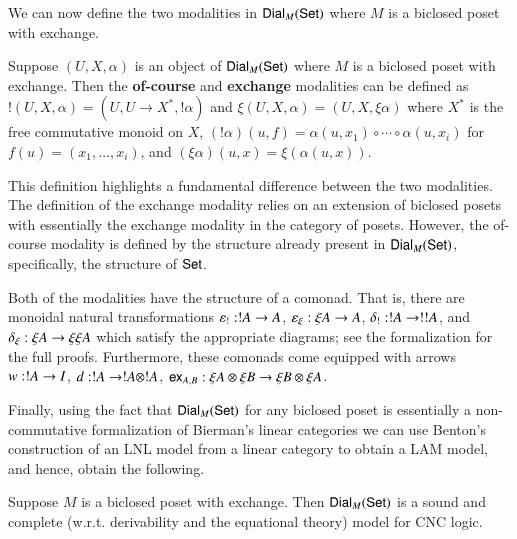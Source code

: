 We can now define the two modalities in $\mathsf{Dial}_{M}(\mathsf{Set})$ where $M$ is
a biclosed poset with exchange.
\begin{definition}
  \label{def:modalities-dial}
  Suppose $(U, X, \alpha)$ is an object of $\mathsf{Dial}_{M}(\mathsf{Set})$ where $M$
  is a biclosed poset with exchange. Then the \textbf{of-course} and
  \textbf{exchange} modalities can be defined as 
  $! (U, X, \alpha) = (U, U \to X^*, !\alpha)$ and
  $\xi (U, X, \alpha) = (U, X, \xi \alpha)$
  where $X^*$ is the free commutative monoid on $X$, $(!\alpha)(u, f)
  = \alpha(u, x_1) \circ \cdots \circ \alpha(u, x_i)$ for $f(u) =
  (x_1, \ldots, x_i)$, and $(\xi \alpha)(u, x) = \xi (\alpha(u,
  x))$.
\end{definition}
This definition highlights a fundamental difference between the two
modalities.  The definition of the exchange modality relies on an
extension of biclosed posets with essentially the exchange modality in
the category of posets.  However, the of-course modality is defined by
the structure already present in $\mathsf{Dial}_{M}(\mathsf{Set})$, specifically, the
structure of $\mathsf{Set}$.

Both of the modalities have the structure of a comonad.  That is,
there are monoidal natural transformations $\varepsilon_! : !A \rightarrow
A$, $\varepsilon_\xi : \xi A \rightarrow A$, $\delta_! : !A \rightarrow !!A$,
and $\delta_\xi : \xi A \rightarrow \xi\xi A$ which satisfy the
appropriate diagrams; see the formalization for the full
proofs. Furthermore, these comonads come equipped with arrows $w : !A
\rightarrow I$, $d : !A \rightarrow !A \otimes !A$, $\mathsf{ex}_{A,B} : \xi A \otimes \xi B \rightarrow \xi B
\otimes \xi A$. 

Finally, using the fact that $\mathsf{Dial}_{M}(\mathsf{Set})$ for any biclosed poset
is essentially a non-commutative formalization of Bierman's linear
categories \cite{Bierman:1994} we can use Benton's construction of an
LNL model from a linear category to obtain a LAM model, and hence,
obtain the following.
\begin{theorem}
  \label{theorem:sound-dial-exchange-!}
  Suppose $M$ is a biclosed poset with exchange.  Then
  $\mathsf{Dial}_{M}(\mathsf{Set})$ is a sound and complete (w.r.t. derivability and
  the equational theory) model for CNC logic.
\end{theorem}

